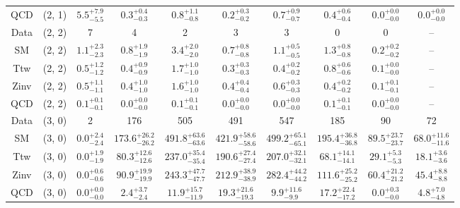\begin{table}[h!]
{\begin{tabular}{cccccccccc}
	QCD & (2, 1) & $5.5^{+ 7.9 }_{- 5.5 }$ & $0.3^{+ 0.4 }_{- 0.3 }$ & $0.8^{+ 1.1 }_{- 0.8 }$ & $0.2^{+ 0.3 }_{- 0.2 }$ & $0.7^{+ 0.9 }_{- 0.7 }$ & $0.4^{+ 0.6 }_{- 0.4 }$ & $0.0^{+ 0.0 }_{- 0.0 }$ & $0.0^{+ 0.0 }_{- 0.0 }$ \\[0.5ex] 
	Data & (2, 2) & 7 & 4 & 2 & 3 & 3 & 0 & 0 & -- \\[0.5ex] 
	SM & (2, 2) & $1.1^{+ 2.3 }_{- 2.3 }$ & $0.8^{+ 1.9 }_{- 1.9 }$ & $3.4^{+ 2.0 }_{- 2.0 }$ & $0.7^{+ 0.8 }_{- 0.8 }$ & $1.1^{+ 0.5 }_{- 0.5 }$ & $1.3^{+ 0.8 }_{- 0.8 }$ & $0.2^{+ 0.2 }_{- 0.2 }$ & -- \\[0.5ex] 
	Ttw & (2, 2) & $0.5^{+ 1.2 }_{- 1.2 }$ & $0.4^{+ 0.9 }_{- 0.9 }$ & $1.7^{+ 1.0 }_{- 1.0 }$ & $0.3^{+ 0.3 }_{- 0.3 }$ & $0.4^{+ 0.2 }_{- 0.2 }$ & $0.8^{+ 0.6 }_{- 0.6 }$ & $0.1^{+ 0.0 }_{- 0.0 }$ & -- \\[0.5ex] 
	Zinv & (2, 2) & $0.5^{+ 1.1 }_{- 1.1 }$ & $0.4^{+ 1.0 }_{- 1.0 }$ & $1.6^{+ 1.0 }_{- 1.0 }$ & $0.4^{+ 0.4 }_{- 0.4 }$ & $0.6^{+ 0.3 }_{- 0.3 }$ & $0.4^{+ 0.2 }_{- 0.2 }$ & $0.1^{+ 0.1 }_{- 0.1 }$ & -- \\[0.5ex] 
	QCD & (2, 2) & $0.1^{+ 0.1 }_{- 0.1 }$ & $0.0^{+ 0.0 }_{- 0.0 }$ & $0.1^{+ 0.1 }_{- 0.1 }$ & $0.0^{+ 0.0 }_{- 0.0 }$ & $0.0^{+ 0.0 }_{- 0.0 }$ & $0.1^{+ 0.1 }_{- 0.1 }$ & $0.0^{+ 0.0 }_{- 0.0 }$ & -- \\[0.5ex] 
	Data & (3, 0) & 2 & 176 & 505 & 491 & 547 & 185 & 90 & 72 \\[0.5ex] 
	SM & (3, 0) & $0.0^{+ 2.4 }_{- 2.4 }$ & $173.6^{+ 26.2 }_{- 26.2 }$ & $491.8^{+ 63.6 }_{- 63.6 }$ & $421.9^{+ 58.6 }_{- 58.6 }$ & $499.2^{+ 65.1 }_{- 65.1 }$ & $195.4^{+ 36.8 }_{- 36.8 }$ & $89.5^{+ 23.7 }_{- 23.7 }$ & $68.0^{+ 11.6 }_{- 11.6 }$ \\[0.5ex] 
	Ttw & (3, 0) & $0.0^{+ 1.9 }_{- 1.9 }$ & $80.3^{+ 12.6 }_{- 12.6 }$ & $237.0^{+ 35.4 }_{- 35.4 }$ & $190.6^{+ 27.4 }_{- 27.4 }$ & $207.0^{+ 32.1 }_{- 32.1 }$ & $68.1^{+ 14.1 }_{- 14.1 }$ & $29.1^{+ 5.3 }_{- 5.3 }$ & $18.1^{+ 3.6 }_{- 3.6 }$ \\[0.5ex] 
	Zinv & (3, 0) & $0.0^{+ 0.6 }_{- 0.6 }$ & $90.9^{+ 19.9 }_{- 19.9 }$ & $243.3^{+ 47.7 }_{- 47.7 }$ & $212.9^{+ 38.9 }_{- 38.9 }$ & $282.4^{+ 44.2 }_{- 44.2 }$ & $111.6^{+ 25.2 }_{- 25.2 }$ & $60.4^{+ 21.2 }_{- 21.2 }$ & $45.4^{+ 8.8 }_{- 8.8 }$ \\[0.5ex] 
	QCD & (3, 0) & $0.0^{+ 0.0 }_{- 0.0 }$ & $2.4^{+ 3.7 }_{- 2.4 }$ & $11.9^{+ 15.7 }_{- 11.9 }$ & $19.3^{+ 21.6 }_{- 19.3 }$ & $9.9^{+ 11.6 }_{- 9.9 }$ & $17.2^{+ 22.4 }_{- 17.2 }$ & $0.0^{+ 0.3 }_{- 0.0 }$ & $4.8^{+ 7.0 }_{- 4.8 }$ \\[0.5ex] 

\end{tabular}}
\end{table}
